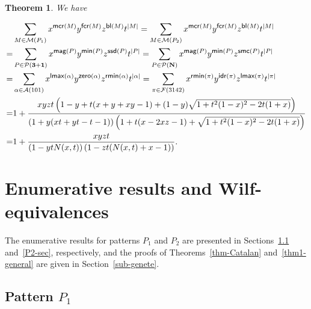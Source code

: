 \documentclass[11pt]{article}
\newtheorem{thm}{Theorem}[section]
\newcommand{\A}{\mathcal{A}}
\newcommand{\F}{\mathcal{F}}
\newcommand{\M}{\mathcal{M}}
\begin{document}
	\begin{thm}\label{thm-P1-P2-joint}
		We have 
		\begin{small}
			\begin{align}
				&  \sum_{M \in \M(P_1)} x^{\mbox{\sf{\footnotesize mcr}}(M)} y^{\mbox{\sf{\footnotesize fcr}}(M)} z^{\mbox{\sf{\footnotesize bl}}(M)} t^{|M|}= \sum_{M \in \M(P_2)} x^{\mbox{\sf{\footnotesize mcr}}(M)} y^{\mbox{\sf{\footnotesize fcr}}(M)} z^{\mbox{\sf{\footnotesize bl}}(M)} t^{|M|}\notag\\
				=    & \sum_{P \in \mathcal{P}{\bf (3+1)}}  x^{\mbox{\sf{\footnotesize mag}}(P)} y^{\mbox{\sf{\footnotesize min}}(P)} z^{\mbox{\sf{\footnotesize ssd}}(P)} t^{|P|}  =  \sum_{P \in \mathcal{P}{\bf (N)}}  x^{\mbox{\sf{\footnotesize mag}}(P)} y^{\mbox{\sf{\footnotesize min}}(P)} z^{\mbox{\sf{\footnotesize smc}}(P)} t^{|P|}   \notag \\
				=   & \sum_{\alpha \in \A(101)} x^{\mbox{\sf{\footnotesize lmax}}(\alpha)}  y^{\mbox{\sf{\footnotesize zero}}(\alpha)} z^{\mbox{\sf{\footnotesize rmin}}(\alpha)} t^{|\alpha|} 
				=\sum_{\pi \in \F(3142)} x^{\mbox{\sf{\footnotesize rmin}}(\pi)} y^{\mbox{\sf{\footnotesize idr}}(\pi)} z^{\mbox{\sf{\footnotesize lmax}}(\pi)}t^{|\pi|} \notag \\
				=&  1 + \frac{x yzt \left( 1-y +t (x + y + x y-1) + (1 - y) \sqrt{1 + t^2 (1 - x)^2 - 2 t (1 + x)} \right) }{\left(1 + y (xt+yt -t -1)\right) \left(1 + t (x - 2 x z-1 ) + \sqrt{1 + t^2 (1 - x)^2 - 2 t (1 + x)}\right)} \label{main-formulas-dist} \\
				=  & 1+ \frac{xyzt}{(1- ytN(x,t)) \left(1- zt(N(x,t)+x-1) \right)}.\label{fomular-sta-P1-P2-joint}
			\end{align}
		\end{small}
	\end{thm}
	
	
	
	\section{Enumerative results and Wilf-equivalences}\label{sec-matching-Catalan}
	
	The enumerative results for patterns $P_1$ and $P_2$ are presented in Sections~\ref{P1-subsec} and~\ref{P2-sec}, respectively, and the proofs of Theorems~\ref{thm-Catalan} and~\ref{thm1-general} are given in Section~\ref{sub-genete}.
	
	\subsection{Pattern $P_1$}\label{P1-subsec}
	
\end{document}

